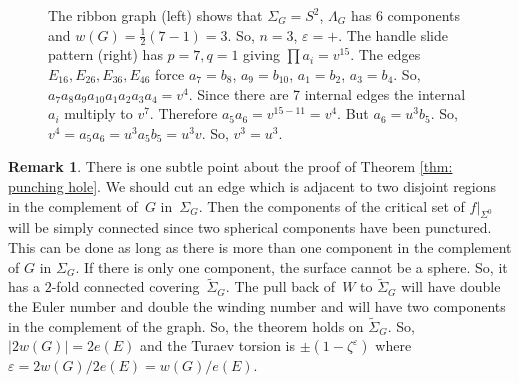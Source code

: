 \documentclass[11pt]{article}
\newcommand{\smaller}{\small}
\numberwithin{equation}{section}\providecommand{\dpl}{\displaystyle}
\theoremstyle{plain}
\theoremstyle{definition}
\newtheorem{remark}[theorem]{Remark}
\let\ve\varepsilon
\begin{document}
\begin{figure}[htbp]
\begin{center}
\caption{\smaller The ribbon graph (left) shows that $\Sigma_G=S^2$, $\Lambda_G$ has 6 components and $w(G)=\frac12(7-1)=3$. So, $n=3$, $\varepsilon=+$. The handle slide pattern (right) has $p=7,q=1$ giving $\prod a_i=v^{15}$. The edges $E_{16},E_{26},E_{36},E_{46}$ force $a_7=b_8$, $a_9=b_{10}$, $a_1=b_2$, $a_3=b_4$. So, $a_7a_8a_9a_{10}a_1a_2a_3a_4=v^4$. Since there are 7 internal edges the internal $a_i$ multiply to $v^7$. Therefore $a_5a_6=v^{15-11}=v^4$. But $a_6=u^3b_5$. So, $v^4=a_5a_6=u^3a_5b_5=u^3v$. So, $v^3=u^3$.}
\label{FigureCA2}
\end{center}
\end{figure}

\begin{remark}
There is one subtle point about the proof of Theorem \ref{thm: punching hole}. We should cut an edge which is adjacent to two disjoint regions in the complement of~$G$ in~$\Sigma_G$. Then the components of the critical set of $f|_{\Sigma^0}$ will be simply connected since two spherical components have been punctured. This can be done as long as there is more than one component in the complement of $G$ in $\Sigma_G$. If there is only one component, the surface cannot be a sphere. So, it has a $2$-fold connected covering~$\widetilde \Sigma_G$. The pull back of~$W$ to $\widetilde \Sigma_G$ will have double the Euler number and double the winding number and will have two components in the complement of the graph. So, the theorem holds on $\widetilde\Sigma_G$. So, $|2w(G)|=2e(E)$ and the Turaev torsion is $\pm(1-\zeta^\ve)$ where $\ve=2w(G)/2e(E)=w(G)/e(E)$.
\end{remark}
\end{document}
